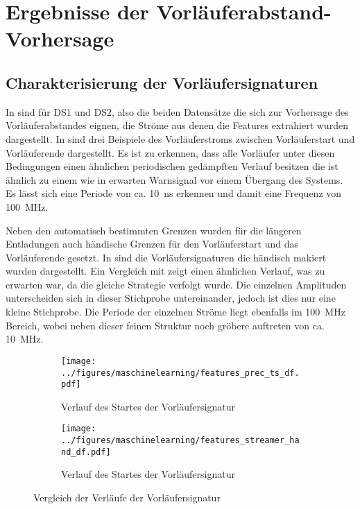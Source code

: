 \section{Ergebnisse der Vorläuferabstand-Vorhersage}

\subsection{Charakterisierung der Vorläufersignaturen}
In  sind für DS1 und DS2, also die beiden Datensätze die sich zur Vorhersage des Vorläuferabstandes eignen, die Ströme aus denen die Features extrahiert wurden dargestellt. In  sind drei Beispiele des Vorläuferstroms zwischen Vorläuferstart und Vorläuferende dargestellt. Es ist zu erkennen, dass alle Vorläufer unter diesen Bedingungen einen ähnlichen periodischen gedämpften Verlauf besitzen die ist ähnlich zu einem wie in  erwarten Warnsignal vor einem Übergang des Systems.  Es lässt sich eine Periode von ca. \SI{10}{\nano\second} erkennen und damit eine Frequenz von \SI{100}{\mega\hertz}.

Neben den automatisch bestimmten Grenzen wurden für die längeren Entladungen auch händische Grenzen für den Vorläuferstart und das Vorläuferende gesetzt. In  sind die Vorläufersignaturen die händisch makiert wurden dargestellt. Ein Vergleich mit  zeigt einen ähnlichen Verlauf, was zu erwarten war, da die gleiche Strategie verfolgt wurde. Die einzelnen Amplituden unterscheiden sich in dieser Stichprobe untereinander, jedoch ist dies nur eine kleine Stichprobe. Die Periode der einzelnen Ströme liegt ebenfalls im \SI{100}{\mega\hertz} Bereich, wobei neben dieser feinen Struktur noch gröbere auftreten von ca. \SI{10}{\mega\hertz}.

\begin{figure}[H]
    \centering
    \begin{subfigure}{0.48\linewidth}
        \centering
        \texttt{[image: ../figures/maschinelearning/features\_prec\_ts\_df.pdf]}
        \caption{Verlauf des Startes der Vorläufersignatur}
        \label{fig:precursor_current_sliece}
    \end{subfigure}
    \hfill
    \begin{subfigure}{0.48\linewidth}
        \centering
        \texttt{[image: ../figures/maschinelearning/features\_streamer\_hand\_df.pdf]}
        \caption{Verlauf des Startes der Vorläufersignatur}
        \label{fig:streamer_current_sliece}
    \end{subfigure}
    \caption{Vergleich der Verläufe der Vorläufersignatur}
    \label{fig:comparison_precursor_streamer}
\end{figure}

